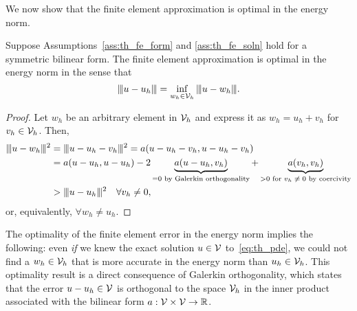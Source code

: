 We now show that the finite element approximation is optimal in the energy norm.
\begin{proposition}
  \label{prop:th_energy_bound}
  Suppose Assumptions~\ref{ass:th_fe_form} and \ref{ass:th_fe_soln} hold for a symmetric bilinear form. 
  The finite element approximation is optimal in the energy norm in the sense that
  \begin{equation}
    |\kern-1pt|\kern-1pt|  u - u_h  |\kern-1pt|\kern-1pt| = \inf_{w_h \in \mathcal{V}_h} |\kern-1pt|\kern-1pt|  u - w_h  |\kern-1pt|\kern-1pt|.
    \label{eq:th_energy_bound}
  \end{equation}
  \begin{proof}
    Let $w_h$ be an arbitrary element in $\mathcal{V}_h$ and express it as $w_h = u_h + v_h$ for $v_h \in \mathcal{V}_h$.  Then,
\begin{align*}
  \enorm{u - w_h}^2 &= \enorm{u - u_h - v_h}^2
  = a(u - u_h - v_h, u - u_h - v_h) \\
  &= a(u - u_h, u - u_h) - 2 \underbrace{ a(u - u_h, v_h) }_{= 0 \text{ by Galerkin orthogonality}} + \underbrace{ a(v_h,v_h) }_{> 0 \text{ for $v_h \neq 0$ by coercivity}}
  \\
  &> \enorm{u - u_h}^2 \quad \forall v_h \neq 0, %
\end{align*}
or, equivalently, $\forall w_h \neq u_h$.
  \end{proof}
\end{proposition}
The optimality of the finite element error in the energy norm implies the following: even \emph{if} we knew the exact solution $u \in \mathcal{V}$ to~\eqref{eq:th_pde}, we could not find a $w_h \in \mathcal{V}_h$ that is more accurate in the energy norm than $u_h \in \mathcal{V}_h$. This optimality result is a direct consequence of Galerkin orthogonality, which states that the error $u - u_h \in \mathcal{V}$ is orthogonal to the space $\mathcal{V}_h$ in the inner product associated with the bilinear form $a: \mathcal{V} \times \mathcal{V} \to \mathbb{R}$.


